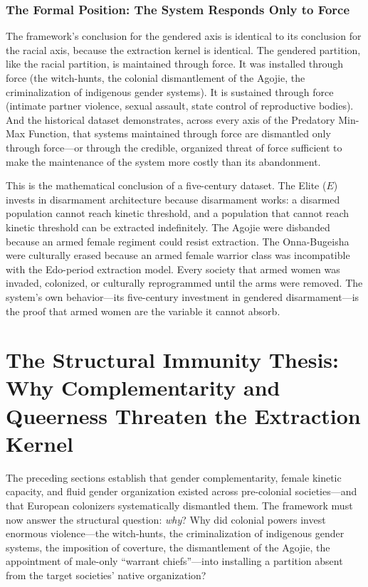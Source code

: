\subsubsection{The Formal Position: The System Responds Only to Force}

The framework's conclusion for the gendered axis is identical to its conclusion for the racial axis, because the extraction kernel is identical. The gendered partition, like the racial partition, is maintained through force. It was installed through force (the witch-hunts, the colonial dismantlement of the Agojie, the criminalization of indigenous gender systems). It is sustained through force (intimate partner violence, sexual assault, state control of reproductive bodies). And the historical dataset demonstrates, across every axis of the Predatory Min-Max Function, that systems maintained through force are dismantled only through force---or through the credible, organized threat of force sufficient to make the maintenance of the system more costly than its abandonment.

This is the mathematical conclusion of a five-century dataset. The Elite ($E$) invests in disarmament architecture because disarmament works: a disarmed population cannot reach kinetic threshold, and a population that cannot reach kinetic threshold can be extracted indefinitely. The Agojie were disbanded because an armed female regiment could resist extraction. The Onna-Bugeisha were culturally erased because an armed female warrior class was incompatible with the Edo-period extraction model. Every society that armed women was invaded, colonized, or culturally reprogrammed until the arms were removed. The system's own behavior---its five-century investment in gendered disarmament---is the proof that armed women are the variable it cannot absorb.

\section{The Structural Immunity Thesis: Why Complementarity and Queerness Threaten the Extraction Kernel}

The preceding sections establish that gender complementarity, female kinetic capacity, and fluid gender organization existed across pre-colonial societies---and that European colonizers systematically dismantled them. The framework must now answer the structural question: \textit{why}? Why did colonial powers invest enormous violence---the witch-hunts, the criminalization of indigenous gender systems, the imposition of coverture, the dismantlement of the Agojie, the appointment of male-only ``warrant chiefs''---into installing a partition absent from the target societies' native organization?

